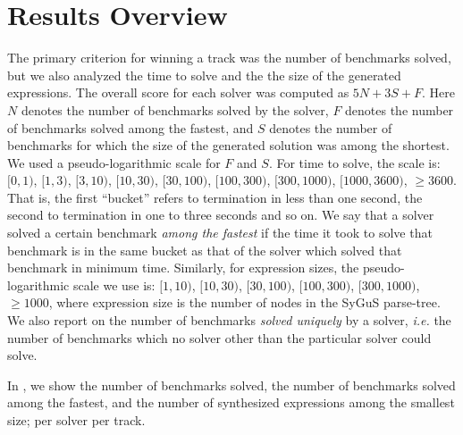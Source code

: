 \section{Results Overview}
\label{sec:comp-results}



The primary criterion for winning a track was the number of benchmarks solved,
but we also analyzed the time to solve and the the size of the generated expressions.
The overall score for each solver was computed as $5N + 3S + F$.
Here $N$ denotes the number of benchmarks solved by the solver,
$F$ denotes the number of benchmarks solved among the fastest,
and $S$ denotes the number of benchmarks for which the size of the generated solution was among the shortest.
We used a pseudo-logarithmic scale for $F$ and $S$.
For time to solve, the scale is: $[0,1)$, $[1,3)$, $[3,10)$, $[10,30)$, $[30, 100)$,
$[100,300)$, $[300, 1000)$, $[1000,3600)$, $\geqslant 3600$.
That is, the first ``bucket'' refers to termination in less than one second,
the second to termination in one to three seconds and so on.
We say that a solver solved a certain benchmark \emph{among the fastest}
if the time it took to solve that benchmark is in the same bucket
as that of the solver which solved that benchmark in minimum time.
Similarly, for expression sizes, the pseudo-logarithmic scale we use is:
$[1,10)$, $[10,30)$, $[30,100)$, $[100,300)$, $[300,1000)$, $\geqslant 1000$,
where expression size is the number of nodes in the SyGuS parse-tree.
We also report on the number of benchmarks \emph{solved uniquely} by a solver,
\emph{i.e.} the number of benchmarks which no solver other than the particular solver could solve.

In , we show the number of benchmarks solved,
the number of benchmarks solved among the fastest,
and the number of synthesized expressions among the smallest size;
per solver per track.

